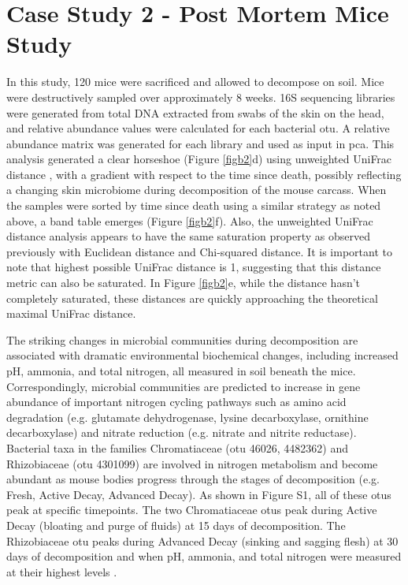 \section*{Case Study 2 - Post Mortem Mice Study}
In this study, 120 mice were sacrificed and allowed to decompose on soil. Mice were destructively sampled over approximately 8 weeks\cite{mammalian_corpse}. 16S sequencing libraries were generated from total DNA extracted from swabs of the skin on the head, and relative abundance values were calculated for each bacterial \gls{otu}. A relative abundance matrix was generated for each library and used as input in \gls{pca}. This analysis generated a clear horseshoe (Figure \ref{figb2}d) using unweighted UniFrac distance \cite{soil_pyro}, with a gradient with respect to the time since death, possibly reflecting a changing skin microbiome during decomposition of the mouse carcass. When the samples were sorted by time since death using a similar strategy as noted above, a band table emerges (Figure \ref{figb2}f). Also, the unweighted UniFrac distance analysis appears to have the same saturation property as observed previously with Euclidean distance and Chi-squared distance.  It is important to note that highest possible UniFrac distance is 1, suggesting that this distance metric can also be saturated.  In Figure \ref{figb2}e, while the distance hasn't completely saturated, these distances are quickly approaching the theoretical maximal UniFrac distance. \par
The striking changes in microbial communities during decomposition are associated with dramatic environmental biochemical changes, including increased pH, ammonia, and total nitrogen, all measured in soil beneath the mice. Correspondingly, microbial communities are predicted to increase in gene abundance of important nitrogen cycling pathways such as amino acid degradation (e.g. glutamate dehydrogenase, lysine decarboxylase, ornithine decarboxylase) and nitrate reduction (e.g. nitrate and nitrite reductase). Bacterial taxa in the families Chromatiaceae (\gls{otu} 46026, 4482362) and Rhizobiaceae (\gls{otu} 4301099) are involved in nitrogen metabolism and become abundant as mouse bodies progress through the stages of decomposition (e.g. Fresh, Active Decay, Advanced Decay).  As shown in Figure S1, all of these \gls{otu}s peak at specific timepoints. The two Chromatiaceae \gls{otu}s peak during Active Decay (bloating and purge of fluids) at 15 days of decomposition. The Rhizobiaceae \gls{otu} peaks during Advanced Decay (sinking and sagging flesh) at 30 days of decomposition and when pH, ammonia, and total nitrogen were measured at their highest levels \cite{mammalian_corpse}.\par
